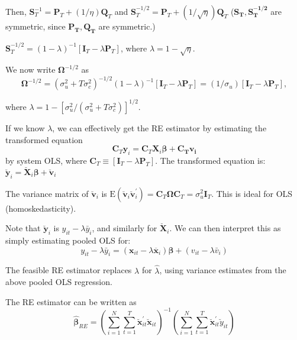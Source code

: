 \documentclass[11pt, a4paper]{report}
\theoremstyle{plain}
\theoremstyle{plain}
\theoremstyle{remark}
\begin{document}
Then, $\mathbf{S}_{T}^{-1}=\mathbf{P}_{T}+(1 / \eta) \mathbf{Q}_{T}$ and $\mathbf{S}_{T}^{-1 / 2}=\mathbf{P}_{T}+(1 / \sqrt{\eta}) \mathbf{Q}_{T}$ ($\mathbf{S_T, S_T^{-1/2}}$ are symmetric, since $\mathbf{P_T, Q_T}$ are symmetric.)

$\mathbf{S}_{T}^{-1 / 2}=(1-\lambda)^{-1}\left[\mathbf{I}_{T}-\lambda \mathbf{P}_{T}\right]$, where $\lambda = 1 - \sqrt{\eta}.$

We now write $\mathbf{\Omega}^{-1/2}$ as
\begin{equation}
 \boldsymbol{\Omega}^{-1 / 2}=\left(\sigma_{u}^{2}+T \sigma_{c}^{2}\right)^{-1 / 2}(1-\lambda)^{-1}\left[\mathbf{I}_{T}-\lambda \mathbf{P}_{T}\right]=\left(1 / \sigma_{u}\right)\left[\mathbf{I}_{T}-\lambda \mathbf{P}_{T}\right],
\end{equation}

where $\lambda=1-\left[\sigma_{u}^{2} /\left(\sigma_{u}^{2}+T \sigma_{c}^{2}\right)\right]^{1 / 2}$.

If we know $\lambda$, we can effectively get the RE estimator by estimating the transformed equation 
\begin{equation}
    \mathbf{C}_{T} \mathbf{y}_{i}=\mathbf{C}_{T} \mathbf{X}_{i} \boldsymbol{\beta}+ \mathbf{C_T v_i}
    \end{equation}
by system OLS, where $\mathbf{C}_{T} \equiv\left[\mathbf{I}_{T}-\lambda \mathbf{P}_{T}\right]$. The transformed equation is:
$\breve{\mathbf{y}}_{i}=\breve{\mathbf{X}}_{i} \boldsymbol{\beta}+\breve{\mathbf{v}}_{i}$

The variance matrix of $\breve{\mathbf{v}}_i$ is $\mathrm{E}\left(\breve{\mathbf{v}}_{i} \breve{\mathbf{v}}_{i}^{\prime}\right)=\mathbf{C}_{T} \boldsymbol{\Omega} \mathbf{C}_{T}=\sigma_{u}^{2} \mathbf{I}_{T}$. This is ideal for OLS (homoskedasticity).

Note that $\breve{\mathbf{y}}_i$ is $y_{it} - \lambda \bar{y}_i$, and similarly for $\breve{\mathbf{X}}_i$. We can then interpret this as simply estimating pooled OLS for:
\begin{equation}
    y_{i t}-\lambda \bar{y}_{i}=\left(\mathbf{x}_{i t}-\lambda \overline{\mathbf{x}}_{i}\right) \boldsymbol{\beta}+\left(v_{i t}-\lambda \bar{v}_{i}\right)
    \end{equation}


The feasible RE estimator replaces $\lambda$ for $\hat{\lambda}$, using variance estimates from the above pooled OLS regression.

The RE estimator can be written as
\begin{equation}
    \hat{\boldsymbol{\beta}}_{R E}=\left(\sum_{i=1}^{N} \sum_{t=1}^{T} \breve{\mathbf{x}}_{i t}^{\prime} \breve{\mathbf{x}}_{i t}\right)^{-1}\left(\sum_{i=1}^{N} \sum_{t=1}^{T} \breve{\mathbf{x}}_{i t}^{\prime} \breve{y}_{i t}\right)
    \end{equation}
\end{document}
